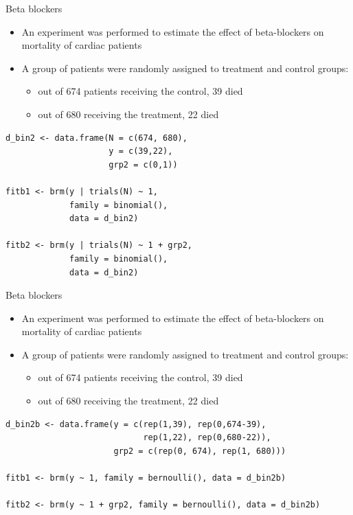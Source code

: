 \documentclass[english,t]{beamer}
\begin{document}
\begin{frame}[fragile]{Beta blockers}

\begin{itemize}
  \item An experiment was performed to estimate the effect of
    beta-blockers on mortality of cardiac patients
  \item A group of
    patients were randomly assigned to treatment and control groups:
    \begin{itemize}
    \item out of 674 patients receiving the control, 39 died
    \item out of 680 receiving the treatment, 22 died
    \end{itemize}
  \end{itemize}

{\footnotesize
\begin{lstlisting}
d_bin2 <- data.frame(N = c(674, 680),
                     y = c(39,22),
                     grp2 = c(0,1))

fitb1 <- brm(y | trials(N) ~ 1,
             family = binomial(),
             data = d_bin2)

fitb2 <- brm(y | trials(N) ~ 1 + grp2,
             family = binomial(),
             data = d_bin2)
\end{lstlisting}}

\end{frame}

\begin{frame}[fragile]{Beta blockers}

\begin{itemize}
  \item An experiment was performed to estimate the effect of
    beta-blockers on mortality of cardiac patients
  \item A group of
    patients were randomly assigned to treatment and control groups:
    \begin{itemize}
    \item out of 674 patients receiving the control, 39 died
    \item out of 680 receiving the treatment, 22 died
    \end{itemize}
  \end{itemize}

{\footnotesize
\begin{lstlisting}
d_bin2b <- data.frame(y = c(rep(1,39), rep(0,674-39),
                            rep(1,22), rep(0,680-22)),
                      grp2 = c(rep(0, 674), rep(1, 680)))

fitb1 <- brm(y ~ 1, family = bernoulli(), data = d_bin2b)

fitb2 <- brm(y ~ 1 + grp2, family = bernoulli(), data = d_bin2b)
\end{lstlisting}}

\end{frame}
\end{document}

